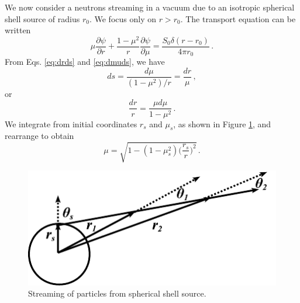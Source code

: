 We now consider a neutrons streaming in a vacuum due to an isotropic spherical shell source of radius $r_0$.  We focus only on $r > r_0$.  The transport equation can be written
\begin{equation}
 \mu \frac{\partial \psi}{\partial r} + \frac{1-\mu^2}{r} \frac{\partial \psi}{\partial \mu} = \frac{S_0\delta(r-r_0)}{4\pi r_0} \, .
\end{equation}
From Eqs. \ref{eq:drds} and \ref{eq:dmuds}, we have
\begin{equation}
 ds = \frac{d\mu}{ (1-\mu^2)/r } = \frac{dr}{\mu} \, ,
\end{equation}
or
\begin{equation}
 \frac{dr}{r} = \frac{\mu d\mu}{1-\mu^2} \, .
\end{equation}
We integrate from initial coordinates $r_s$ and $\mu_s$, as shown in Figure \ref{fig:sphere_example}, and rearrange to obtain
\begin{equation}
 \mu = \sqrt{ 1 - (1-\mu^2_s)\Big (\frac{r_s}{r} \Big )^2  } \, .
 \label{eq:angularrestribution}
\end{equation}
\begin{figure}[ht] 
    \centering
    \includegraphics[keepaspectratio, width = 2.5 in]{images/sphere_example}
    \caption{Streaming of particles from spherical shell source.}
    \label{fig:sphere_example}
\end{figure}

